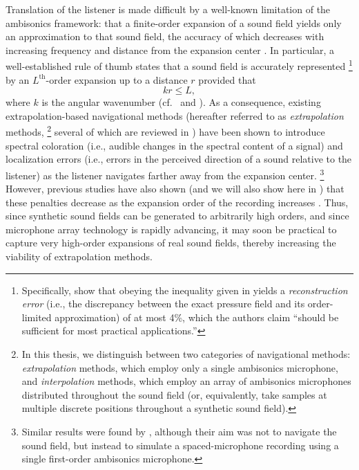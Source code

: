 Translation of the listener is made difficult by a well-known limitation of the ambisonics framework: that a finite-order expansion of a sound field yields only an approximation to that sound field, the accuracy of which decreases with increasing frequency and distance from the expansion center \citep{Poletti2005,WardAbhayapala2001}.
In particular, a well-established rule of thumb states that a sound field is accurately represented%
\footnote{Specifically, \citet{WardAbhayapala2001} show that obeying the inequality given in  yields a \textit{reconstruction error} (i.e., the discrepancy between the exact pressure field and its order-limited approximation) of at most 4\%, which the authors claim ``should be sufficient for most practical applications.''}
by an $L^\textrm{th}$-order expansion up to a distance $r$ provided that
\begin{equation}\label{eq:01_Introduction:kr_Inequality}
kr \leq L,
\end{equation}
where $k$ is the angular wavenumber \citep[Eq.~(17)]{WardAbhayapala2001}
(cf.~\citet[Eq.~(28)]{Poletti2005} and \citet[p.~289]{Nicol2017}).
As a consequence, existing extrapolation-based navigational methods (hereafter referred to as \textit{extrapolation} methods,%
\footnote{In this thesis, we distinguish between two categories of navigational methods: \textit{extrapolation} methods, which employ only a single ambisonics microphone, and \textit{interpolation} methods, which employ an array of ambisonics microphones distributed throughout the sound field (or, equivalently, take samples at multiple discrete positions throughout a synthetic sound field).}
several of which are reviewed in ) have been shown to introduce spectral coloration (i.e., audible changes in the spectral content of a signal) \citep{KuntzRabenstein2007,HahnSpors2015b} and localization errors (i.e., errors in the perceived direction of a sound relative to the listener) \citep{Winter2014,TylkaChoueiri2015} as the listener navigates farther away from the expansion center.%
\footnote{Similar results were found by \citet{WaltherFaller2010}, although their aim was not to navigate the sound field, but instead to simulate a spaced-microphone recording using a single first-order ambisonics microphone.}
However, previous studies have also shown (and we will also show here in ) that these penalties decrease as the expansion order of the recording increases \citep{Winter2014,TylkaChoueiri2015}.
Thus, since synthetic sound fields can be generated to arbitrarily high orders, and since microphone array technology is rapidly advancing, it may soon be practical to capture very high-order expansions of real sound fields, thereby increasing the viability of extrapolation methods.

